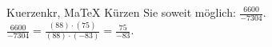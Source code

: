 \begin{MAufgabe}{Kuerzen}{kr, MaTeX}
K\"urzen Sie soweit m\"oglich: $\frac{6600}{-7304}$.\\ 
\ifLsg\MLoesung
\quad $\frac{6600}{-7304}=\frac{(88)\cdot(75)}{(88)\cdot(-83)}=\frac{75}{-83}$.\else\relax\fi
 \end{MAufgabe}